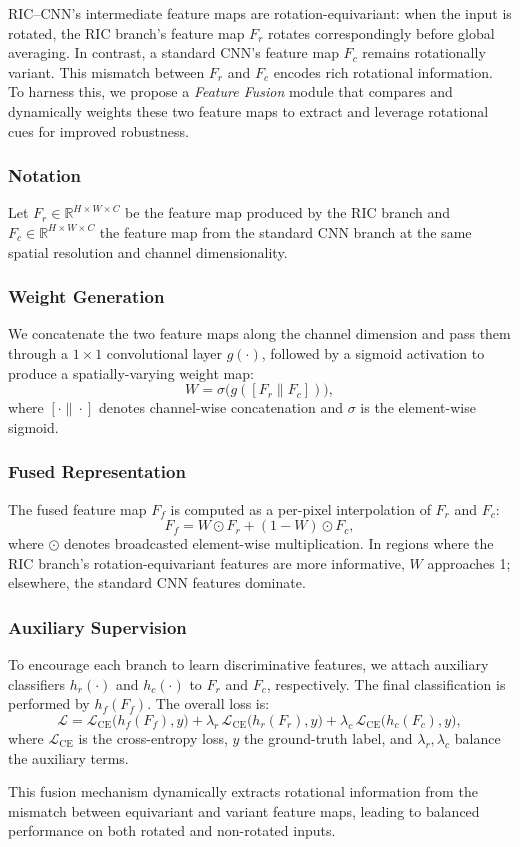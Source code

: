 RIC–CNN’s intermediate feature maps are rotation-equivariant: when the input is rotated, the RIC branch’s feature map $F_r$ rotates correspondingly before global averaging. In contrast, a standard CNN’s feature map $F_c$ remains rotationally variant. This mismatch between $F_r$ and $F_c$ encodes rich rotational information. To harness this, we propose a \emph{Feature Fusion} module that compares and dynamically weights these two feature maps to extract and leverage rotational cues for improved robustness.

\subsubsection{Notation}
Let $F_r\in\mathbb{R}^{H\times W\times C}$ be the feature map produced by the RIC branch and $F_c\in\mathbb{R}^{H\times W\times C}$ the feature map from the standard CNN branch at the same spatial resolution and channel dimensionality.

\subsubsection{Weight Generation}
We concatenate the two feature maps along the channel dimension and pass them through a $1\times1$ convolutional layer $g(\cdot)$, followed by a sigmoid activation to produce a spatially-varying weight map:
\[
W = \sigma\bigl(g([F_r \| F_c])\bigr),
\]
where $[\cdot\|\cdot]$ denotes channel-wise concatenation and $\sigma$ is the element-wise sigmoid.

\subsubsection{Fused Representation}
The fused feature map $F_f$ is computed as a per-pixel interpolation of $F_r$ and $F_c$:
\[
F_f = W \odot F_r + (1 - W) \odot F_c,
\]
where $\odot$ denotes broadcasted element-wise multiplication. In regions where the RIC branch’s rotation-equivariant features are more informative, $W$ approaches 1; elsewhere, the standard CNN features dominate.

\subsubsection{Auxiliary Supervision}
To encourage each branch to learn discriminative features, we attach auxiliary classifiers $h_r(\cdot)$ and $h_c(\cdot)$ to $F_r$ and $F_c$, respectively. The final classification is performed by $h_f(F_f)$. The overall loss is:
\[
\mathcal{L} = \mathcal{L}_{\mathrm{CE}}\bigl(h_f(F_f), y\bigr) + \lambda_r \, \mathcal{L}_{\mathrm{CE}}\bigl(h_r(F_r), y\bigr) + \lambda_c \, \mathcal{L}_{\mathrm{CE}}\bigl(h_c(F_c), y\bigr),
\]
where $\mathcal{L}_{\mathrm{CE}}$ is the cross-entropy loss, $y$ the ground-truth label, and $\lambda_r,\lambda_c$ balance the auxiliary terms.

This fusion mechanism dynamically extracts rotational information from the mismatch between equivariant and variant feature maps, leading to balanced performance on both rotated and non-rotated inputs.